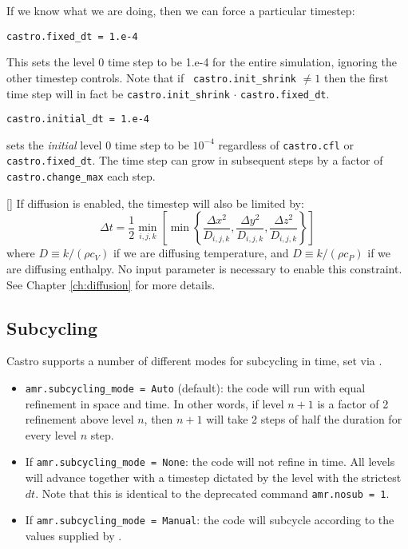 If we know what we are doing, then we can force a particular timestep:
\begin{lstlisting}
castro.fixed_dt = 1.e-4
\end{lstlisting}
This sets the level 0 time step to be 1.e-4 for the entire simulation,
ignoring the other timestep controls.  Note that if {\tt
  castro.init\_shrink} $\neq 1$ then the first time step will in fact
be {\tt castro.init\_shrink} $\cdot$ {\tt castro.fixed\_dt}. \newline

\begin{lstlisting}
castro.initial_dt = 1.e-4
\end{lstlisting}
sets the {\it initial} level 0 time step to be $10^{-4}$ regardless of 
{\tt castro.cfl} or {\tt castro.fixed\_dt}.  The time step can
grow in subsequent steps by a factor of {\tt castro.change\_max} each step.



{[]} If diffusion is enabled, the timestep will also
be limited by:
\begin{equation}
\Delta t = \frac{1}{2}\min_{i,j,k}\left[\min\left\{\frac{\Delta x^2}{D_{i,j,k}},
                                                   \frac{\Delta y^2}{D_{i,j,k}},
                                                   \frac{\Delta z^2}{D_{i,j,k}}\right\}\right]
\end{equation}
where $D \equiv k / (\rho c_V)$ if we are diffusing temperature, and
$D \equiv k / (\rho c_P)$ if we are diffusing enthalpy. No input parameter
is necessary to enable this constraint. See Chapter \ref{ch:diffusion} for more details.



\subsection{Subcycling}
Castro supports a number of different modes for subcycling in time,
set via .

\begin{itemize}
\item {\tt amr.subcycling\_mode = Auto} (default): the code will run
  with equal refinement in space and time. In other words, if level
  $n+1$ is a factor of 2 refinement above level $n$, then $n+1$ will
  take 2 steps of half the duration for every level $n$ step.

\item If {\tt amr.subcycling\_mode = None}: the code will not refine
  in time. All levels will advance together with a timestep dictated
  by the level with the strictest $dt$. Note that this is identical to
  the deprecated command {\tt amr.nosub = 1}.

\item If {\tt amr.subcycling\_mode = Manual}: the code will subcycle
  according to the values supplied by .

\end{itemize}

